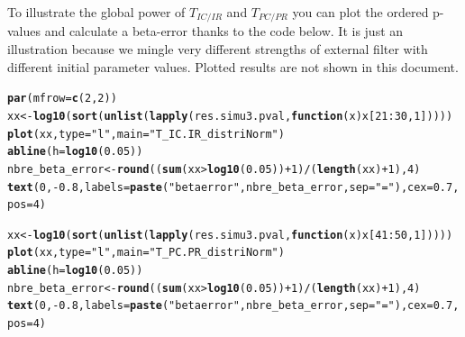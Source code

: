 \documentclass[12pt]{article}\usepackage[]{graphicx}\usepackage[]{color}
\makeatletter
\newcommand{\hlnum}[1]{\textcolor[rgb]{0.686,0.059,0.569}{#1}}%
\newcommand{\hlstr}[1]{\textcolor[rgb]{0.192,0.494,0.8}{#1}}%
\newcommand{\hlopt}[1]{\textcolor[rgb]{0,0,0}{#1}}%
\newcommand{\hlstd}[1]{\textcolor[rgb]{0.345,0.345,0.345}{#1}}%
\newcommand{\hlkwa}[1]{\textcolor[rgb]{0.161,0.373,0.58}{\textbf{#1}}}%
\newcommand{\hlkwb}[1]{\textcolor[rgb]{0.69,0.353,0.396}{#1}}%
\newcommand{\hlkwc}[1]{\textcolor[rgb]{0.333,0.667,0.333}{#1}}%
\newcommand{\hlkwd}[1]{\textcolor[rgb]{0.737,0.353,0.396}{\textbf{#1}}}%
\newenvironment{kframe}{%
 \def\at@end@of@kframe{}%
 \ifinner\ifhmode%
  \def\at@end@of@kframe{\end{minipage}}%
  \begin{minipage}{\columnwidth}%
 \fi\fi%
 \def\FrameCommand##1{\hskip\@totalleftmargin \hskip-\fboxsep
 \colorbox{shadecolor}{##1}\hskip-\fboxsep
     \hskip-\linewidth \hskip-\@totalleftmargin \hskip\columnwidth}%
 \MakeFramed {\advance\hsize-\width
   \@totalleftmargin\z@ \linewidth\hsize
   \@setminipage}}%
 {\par\unskip\endMakeFramed%
 \at@end@of@kframe}
\newenvironment{knitrout}{}{} %
\makeatother
\begin{document}
To illustrate the global power of $T_{IC/IR}$ and $T_{PC/PR}$ you can plot the ordered p-values and calculate a beta-error thanks to the code below. It is just an illustration because we mingle very different strengths of external filter with different initial parameter values. Plotted results are not shown in this document. 
 
\begin{knitrout}\small
{}\color{fgcolor}\begin{kframe}
\begin{alltt}
\hlkwd{par}\hlstd{(}\hlkwc{mfrow} \hlstd{=} \hlkwd{c}\hlstd{(}\hlnum{2}\hlstd{,} \hlnum{2}\hlstd{))}
\hlstd{xx} \hlkwb{<-} \hlkwd{log10}\hlstd{(}\hlkwd{sort}\hlstd{(}\hlkwd{unlist}\hlstd{(}\hlkwd{lapply}\hlstd{(res.simu3.pval,} \hlkwa{function}\hlstd{(}\hlkwc{x}\hlstd{) x[}\hlnum{21}\hlopt{:}\hlnum{30}\hlstd{,} \hlnum{1}\hlstd{]))))}
\hlkwd{plot}\hlstd{(xx,} \hlkwc{type} \hlstd{=} \hlstr{"l"}\hlstd{,} \hlkwc{main} \hlstd{=} \hlstr{"T_IC.IR_distriNorm"}\hlstd{)}
\hlkwd{abline}\hlstd{(}\hlkwc{h} \hlstd{=} \hlkwd{log10}\hlstd{(}\hlnum{0.05}\hlstd{))}
\hlstd{nbre_beta_error} \hlkwb{<-} \hlkwd{round}\hlstd{((}\hlkwd{sum}\hlstd{(xx}\hlopt{>}\hlkwd{log10}\hlstd{(}\hlnum{0.05}\hlstd{))}\hlopt{+}\hlnum{1}\hlstd{)}\hlopt{/}\hlstd{(}\hlkwd{length}\hlstd{(xx)}\hlopt{+}\hlnum{1}\hlstd{),} \hlnum{4}\hlstd{)}
\hlkwd{text}\hlstd{(}\hlnum{0}\hlstd{,} \hlopt{-}\hlnum{0.8}\hlstd{,} \hlkwc{labels} \hlstd{=} \hlkwd{paste}\hlstd{(}\hlstr{"beta error"}\hlstd{, nbre_beta_error,} \hlkwc{sep} \hlstd{=} \hlstr{" = "}\hlstd{),} \hlkwc{cex} \hlstd{=} \hlnum{0.7}\hlstd{,} \hlkwc{pos} \hlstd{=} \hlnum{4}\hlstd{)}

\hlstd{xx} \hlkwb{<-} \hlkwd{log10}\hlstd{(}\hlkwd{sort}\hlstd{(}\hlkwd{unlist}\hlstd{(}\hlkwd{lapply}\hlstd{(res.simu3.pval,} \hlkwa{function}\hlstd{(}\hlkwc{x}\hlstd{) x[}\hlnum{41}\hlopt{:}\hlnum{50}\hlstd{,} \hlnum{1}\hlstd{]))))}
\hlkwd{plot}\hlstd{(xx,} \hlkwc{type} \hlstd{=} \hlstr{"l"}\hlstd{,} \hlkwc{main} \hlstd{=} \hlstr{"T_PC.PR_distriNorm"}\hlstd{)}
\hlkwd{abline}\hlstd{(}\hlkwc{h} \hlstd{=} \hlkwd{log10}\hlstd{(}\hlnum{0.05}\hlstd{))}
\hlstd{nbre_beta_error} \hlkwb{<-} \hlkwd{round}\hlstd{((}\hlkwd{sum}\hlstd{(xx}\hlopt{>}\hlkwd{log10}\hlstd{(}\hlnum{0.05}\hlstd{))}\hlopt{+}\hlnum{1}\hlstd{)}\hlopt{/}\hlstd{(}\hlkwd{length}\hlstd{(xx)}\hlopt{+}\hlnum{1}\hlstd{),} \hlnum{4}\hlstd{)}
\hlkwd{text}\hlstd{(}\hlnum{0}\hlstd{,} \hlopt{-}\hlnum{0.8}\hlstd{,} \hlkwc{labels} \hlstd{=} \hlkwd{paste}\hlstd{(}\hlstr{"beta error"}\hlstd{, nbre_beta_error,} \hlkwc{sep} \hlstd{=} \hlstr{" = "}\hlstd{),} \hlkwc{cex} \hlstd{=} \hlnum{0.7}\hlstd{,} \hlkwc{pos} \hlstd{=} \hlnum{4}\hlstd{)}



\end{alltt}
\end{kframe}
\end{knitrout}
\end{document}
